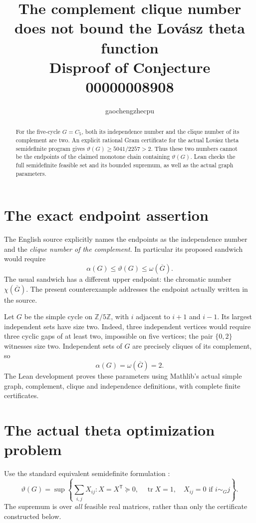 \documentclass[11pt]{article}
\title{The complement clique number does not bound\newline
the Lov\'asz theta function\\\large Disproof of Conjecture 00000008908}
\author{gaochengzhecpu}\date{}
\begin{document}
\maketitle
\begin{abstract}
For the five-cycle $G=C_5$, both its independence number and
the clique number of its complement are two. An explicit
rational Gram certificate for the actual Lov\'asz theta
semidefinite program gives
$\vartheta(G)\geq5041/2257>2$.
Thus these two numbers cannot be the endpoints of the
claimed monotone chain containing $\vartheta(G)$.
Lean checks the full semidefinite feasible set and its
bounded supremum, as well as the actual graph parameters.
\end{abstract}

\section*{The exact endpoint assertion}
The English source explicitly names the endpoints as the
independence number and the \emph{clique number of the
complement}. In particular its proposed sandwich would require
\[
              \alpha(G)\leq\vartheta(G)\leq\omega(\overline G).
\]
The usual sandwich has a different upper endpoint: the
chromatic number $\chi(\overline G)$. The present counterexample
addresses the endpoint actually written in the source.

Let $G$ be the simple cycle on $\mathbb Z/5\mathbb Z$, with
$i$ adjacent to $i+1$ and $i-1$. Its largest independent sets
have size two. Indeed, three independent vertices would
require three cyclic gaps of at least two, impossible on
five vertices; the pair $\{0,2\}$ witnesses size two.
Independent sets of $G$ are precisely cliques of its
complement, so
\[
                   \alpha(G)=\omega(\overline G)=2.
\]
The Lean development proves these parameters using Mathlib's
actual simple graph, complement, clique and independence
definitions, with complete finite certificates.

\section*{The actual theta optimization problem}
Use the standard equivalent semidefinite formulation
\cite[Theorem 4]{lovasz}:
\[
 \vartheta(G)=\sup\left\{\sum_{i,j}X_{ij}:
 X=X^{\mathsf T}\succeq0,\quad\operatorname{tr}X=1,
 \quad X_{ij}=0\text{ if }i\sim_G j\right\}.
\]
The supremum is over \emph{all} feasible real matrices,
rather than only the certificate constructed below.
\end{document}
